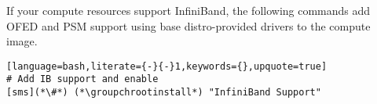If your compute resources support InfiniBand, the following commands add OFED
and PSM support using base distro-provided drivers to the compute
image.

\begin{lstlisting}[language=bash,literate={-}{-}1,keywords={},upquote=true]
# Add IB support and enable
[sms](*\#*) (*\groupchrootinstall*) "InfiniBand Support"
\end{lstlisting}

